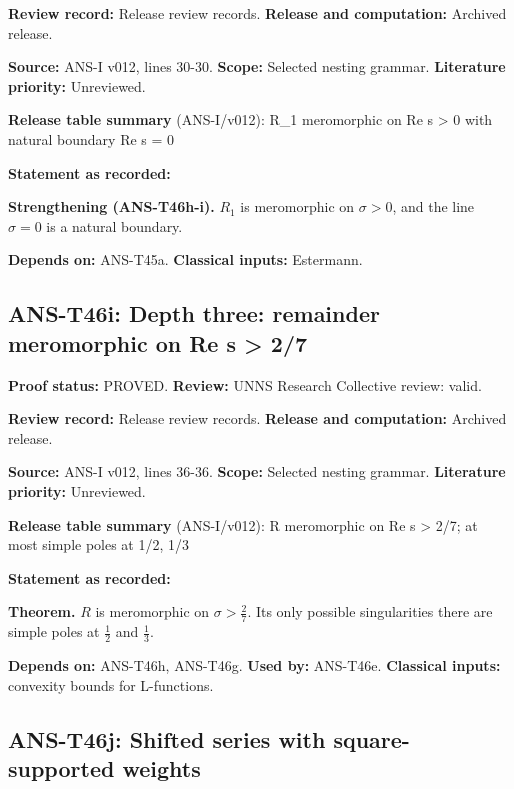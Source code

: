\documentclass[
  11pt,
]{article}
\begin{document}
\textbf{Review record:} Release review records. \textbf{Release and
computation:} Archived release.

\textbf{Source:} ANS-I v012, lines 30-30. \textbf{Scope:} Selected
nesting grammar. \textbf{Literature priority:} Unreviewed.

\textbf{Release table summary} (ANS-I/v012): R\_1 meromorphic on Re s
\textgreater{} 0 with natural boundary Re s = 0

\textbf{Statement as recorded:}

\textbf{Strengthening (ANS-T46h-i).} \(R_1\) is meromorphic on
\(\sigma>0\), and the line \(\sigma=0\) is a natural boundary.

\textbf{Depends on:} ANS-T45a. \textbf{Classical inputs:} Estermann.

\hypertarget{ans-t46i-depth-three-remainder-meromorphic-on-re-s-27}{%
\subsection{ANS-T46i: Depth three: remainder meromorphic on Re s
\textgreater{}
2/7}\label{ans-t46i-depth-three-remainder-meromorphic-on-re-s-27}}

\textbf{Proof status:} PROVED. \textbf{Review:} UNNS Research Collective
review: valid.

\textbf{Review record:} Release review records. \textbf{Release and
computation:} Archived release.

\textbf{Source:} ANS-I v012, lines 36-36. \textbf{Scope:} Selected
nesting grammar. \textbf{Literature priority:} Unreviewed.

\textbf{Release table summary} (ANS-I/v012): R meromorphic on Re s
\textgreater{} 2/7; at most simple poles at 1/2, 1/3

\textbf{Statement as recorded:}

\textbf{Theorem.} \(R\) is meromorphic on \(\sigma>\frac27\). Its only
possible singularities there are simple poles at \(\frac12\) and
\(\frac13\).

\textbf{Depends on:} ANS-T46h, ANS-T46g. \textbf{Used by:} ANS-T46e.
\textbf{Classical inputs:} convexity bounds for L-functions.

\hypertarget{ans-t46j-shifted-series-with-square-supported-weights}{%
\subsection{ANS-T46j: Shifted series with square-supported
weights}\label{ans-t46j-shifted-series-with-square-supported-weights}}
\end{document}
